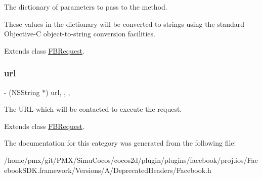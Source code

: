 The dictionary of parameters to pass to the method.

These values in the dictionary will be converted to strings using the standard Objective-\/C object-\/to-\/string conversion facilities. 

Extends class \hyperlink{interfaceFBRequest_abc65f409227938e45243e9aa31c3f1d5}{F\+B\+Request}.

\mbox{\label{categoryFBRequest_07Deprecated_08_ac05e6fc5503b9806a900c423ce1f65d5}} 
\subsubsection{\texorpdfstring{url}{url}}
{\footnotesize\ttfamily -\/ (N\+S\+String $\ast$) url\hspace{0.3cm}{\ttfamily [read]}, {\ttfamily [write]}, {\ttfamily [nonatomic]}, {\ttfamily [copy]}}

The U\+RL which will be contacted to execute the request. 

Extends class \hyperlink{interfaceFBRequest_ac05e6fc5503b9806a900c423ce1f65d5}{F\+B\+Request}.



The documentation for this category was generated from the following file\+:\begin{DoxyCompactItemize}
\item 
/home/pmx/git/\+P\+M\+X/\+Simu\+Cocos/cocos2d/plugin/plugins/facebook/proj.\+ios/\+Facebook\+S\+D\+K.\+framework/\+Versions/\+A/\+Deprecated\+Headers/Facebook.\+h\end{DoxyCompactItemize}
